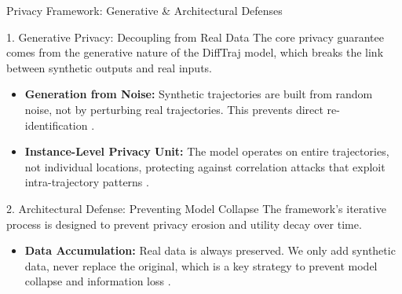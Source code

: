 \documentclass[aspectratio=169,xcolor={dvipsnames}]{beamer}
\begin{document}
\begin{frame}{Privacy Framework: Generative \& Architectural Defenses}
    \begin{block}{1. Generative Privacy: Decoupling from Real Data}
        \small
        The core privacy guarantee comes from the generative nature of the DiffTraj model, which breaks the link between synthetic outputs and real inputs.
        \begin{itemize}
            \item \textbf{Generation from Noise:} Synthetic trajectories are built from random noise, not by perturbing real trajectories. This prevents direct re-identification \cite{zhuDiffTrajGeneratingGPS2023}.
            \item \textbf{Instance-Level Privacy Unit:} The model operates on entire trajectories, not individual locations, protecting against correlation attacks that exploit intra-trajectory patterns \cite{buchholzSystematisationKnowledgeTrajectory2024}.
        \end{itemize}
    \end{block}
    
    \vspace{1em}
    \begin{block}{2. Architectural Defense: Preventing Model Collapse}
        \small
        The framework's iterative process is designed to prevent privacy erosion and utility decay over time.
        \begin{itemize}
            \item \textbf{Data Accumulation:} Real data is always preserved. We only add synthetic data, never replace the original, which is a key strategy to prevent model collapse and information loss \cite{gerstgrasserModelCollapseInevitable2024}.
        \end{itemize}
    \end{block}
\end{frame}
\end{document}
